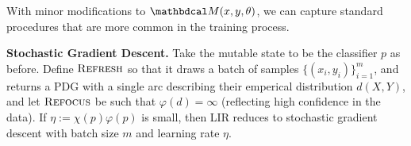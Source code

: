 \documentclass{article} %
\theoremstyle{plain}
\theoremstyle{definition}
\theoremstyle{remark}
\begin{document}
With minor modifications to $\dg M(x,y,\theta)$, we can capture standard procedures that are more common in the training process.

\textbf{Stochastic Gradient Descent.} \label{sec:SGD}
Take the mutable state to be the classifier $p$ as before.
Define $\textsc{Refresh}$ so that it draws a batch of samples $\{(x_i,y_i)\}_{i=1}^m$,
and returns a PDG with a single arc describing their emperical distribution $d(X,Y)$, and
let $\textsc{Refocus}$ be such that $\varphi(d) = \infty$
   (reflecting high confidence in the data).
If $\eta := \chi(p) \varphi(p)$ is small, then
   LIR reduces to stochastic gradient descent with batch size $m$ and learning rate $\eta$.
\end{document}
